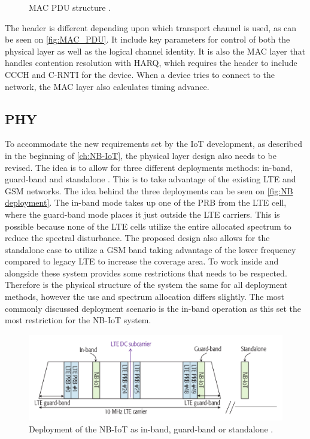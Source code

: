 \begin{figure}[H]
\centering
\resizebox{\textwidth}{!}{
}
\caption{MAC PDU structure \citep[Sec. 6.3]{book_LTE_for_UMTS}.}
\label{fig:MAC_PDU}
\end{figure}

The header is different depending upon which transport channel is used, as can be seen on \autoref{fig:MAC_PDU}. It include key parameters for control of both the physical layer as well as the logical channel identity. It is also the \gls{MAC} layer that handles contention resolution with \gls{HARQ}, which requires the header to include \gls{CCCH} and \gls{C-RNTI} for the device. When a device tries to connect to the network, the \gls{MAC} layer also calculates timing advance. \citep[Sec. 6.3]{book_LTE_for_UMTS}


\subsection{PHY}\label{sec:NB-IoT/Physical Layer}

To accommodate the new requirements set by the \gls{IoT} development, as described in the beginning of \autoref{ch:NB-IoT}, the physical layer design also needs to be revised. The idea is to allow for three different deployments methods: in-band, guard-band and standalone \citep{primer}. This is to take advantage of the existing \gls{LTE} and \gls{GSM} networks. The idea behind the three deployments can be seen on \autoref{fig:NB deployment}. The in-band mode takes up one of the \gls{PRB} from the \gls{LTE} cell, where the guard-band mode places it just outside the LTE carriers. This is possible because none of the \gls{LTE} cells utilize the entire allocated spectrum to reduce the spectral disturbance. The proposed design also allows for the standalone case to utilize a \gls{GSM} band taking advantage of the lower frequency compared to legacy \gls{LTE} to increase the coverage area. To work inside and alongside these system provides some restrictions that needs to be respected. Therefore is the physical structure of the system the same for all deployment methods, however the use and spectrum allocation differs slightly. The most commonly discussed deployment scenario is the in-band operation as this set the most restriction for the \gls{NB-IoT} system. \citep{REL-13,primer}

\begin{figure}[H]
\centering
\includegraphics[width=\textwidth]{figures/deployment.png}
\caption{Deployment of the NB-IoT as in-band, guard-band or standalone \citep{primer}.}
\label{fig:NB deployment}
\end{figure}

